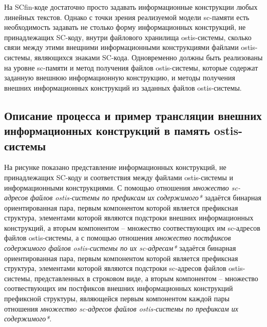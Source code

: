 На SCfin-коде достаточно просто задавать информационные конструкции любых линейных текстов. Однако с точки зрения реализуемой модели sc-памяти есть необходимость задавать не столько форму информационных конструкций, не принадлежащих SC-коду, внутри файлового хранилища ostis-системы, сколько связи между этими внещними информационными конструкциями файлами ostis-системы, являющихся знаками SC-кода. Одновременно должны быть реализованы на уровне sc-памяти и метод получения файлов ostis-системы, которые содержат заданную внешнюю информационную конструкцию, и методы получения внешних информационных конструкций из заданных файлов ostis-системы.

\subsection{Описание процесса и пример трансляции внешних информационных конструкций в память ostis-системы}
\label{sec_soft_platform_scfin_code_example}

На рисунке  показано представление информационных конструкций, не принадлежащих SC-коду и соответствия между файлами ostis-системы и информационными конструкциями. С помощью отношения \textit{множество sc-адресов файлов ostis-системы по префиксам их содержимого*} задаётся бинарная ориентированная пара, первым компонентом которой является префиксная структура, элементами которой являются подстроки внешних информационных конструкций, а вторым компонентом -- множество соотвествующих им sc-адресов файлов ostis-системы, а с помощью отношения \textit{множество постфиксов содержимого файлов ostis-системы по их sc-адресам*} задаётся бинарная ориентированная пара, первым компонентом которой является префиксная структура, элементами которой являются подстроки sc-адресов файлов ostis-системы, представленных в строковом виде, а вторым компонентом -- множество соотвествующих им постфиксов внешних информационных конструкций префиксной структуры, являющейся первым компонентом каждой пары отношения \textit{множество sc-адресов файлов ostis-системы по префиксам их содержимого*}.

